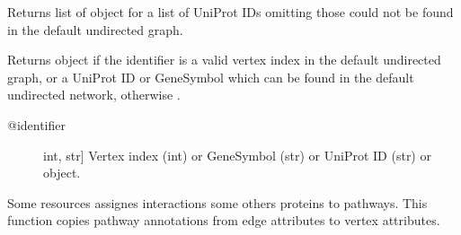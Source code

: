\documentclass[letterpaper,10pt,english]{sphinxmanual}
\begin{document}
\begin{fulllineitems}
\begin{fulllineitems}
\end{fulllineitems}


\begin{fulllineitems}
\label{\detokenize{main:pypath.main.PyPath.ups}}
Returns list of  object
for a list of UniProt IDs omitting those
could not be found in the default
undirected graph.

\end{fulllineitems}


\begin{fulllineitems}
\label{\detokenize{main:pypath.main.PyPath.v}}
Returns  object if the identifier
is a valid vertex index in the default undirected graph,
or a UniProt ID or GeneSymbol which can be found in the
default undirected network, otherwise .
\begin{description}
\item[{@identifier}] \leavevmode{[}int, str{]}
Vertex index (int) or GeneSymbol (str) or UniProt ID (str) or
 object.

\end{description}

\end{fulllineitems}


\begin{fulllineitems}
\label{\detokenize{main:pypath.main.PyPath.vertex_pathways}}
Some resources assignes interactions some others proteins to
pathways. This function copies pathway annotations from edge
attributes to vertex attributes.

\end{fulllineitems}


\begin{fulllineitems}
\label{\detokenize{main:pypath.main.PyPath.vs}}
\end{fulllineitems}


\end{fulllineitems}
\end{document}
